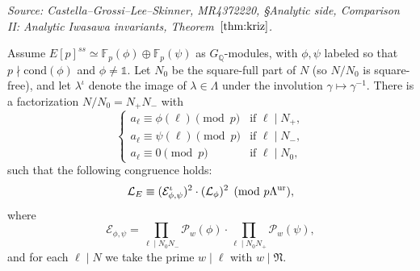 \begin{theorem}
  \label{thm:kriz}
  \textit{Source: Castella--Grossi--Lee--Skinner, MR4372220, §Analytic side, Comparison II: Analytic Iwasawa invariants, Theorem~\(\ref{thm:kriz}\).}

  Assume \(E[p]^{ss}\simeq\mathbb{F}_p(\phi)\oplus\mathbb{F}_p(\psi)\) as \(G_{\mathbb{Q}}\)-modules, with \(\phi,\psi\) labeled so that \(p\nmid\mathrm{cond}(\phi)\) and \(\phi\neq\mathds{1}\). Let \(N_0\) be the square-full part of \(N\) (so \(N/N_0\) is square-free), and let \(\lambda^\iota\) denote the image of \(\lambda\in\Lambda\) under the involution \(\gamma\mapsto\gamma^{-1}\). There is a factorization \(N/N_0 = N_+ N_-\) with
  \[
    \begin{cases}
      a_\ell \equiv \phi(\ell)\pmod{p} & \text{if } \ell\mid N_+,\\
      a_\ell \equiv \psi(\ell)\pmod{p} & \text{if } \ell\mid N_-,\\
      a_\ell \equiv 0\pmod{p}          & \text{if } \ell\mid N_0,
    \end{cases}
  \]
  such that the following congruence holds:
  \[
    \mathcal{L}_E \equiv (\mathcal{E}_{\phi,\psi}^\iota)^2 \cdot (\mathcal{L}_\phi)^2 \pmod{p\Lambda^{\mathrm{ur}}},
  \]
  where
  \[
    \mathcal{E}_{\phi,\psi}
    = \prod_{\ell\mid N_0 N_-}\mathcal{P}_w(\phi)
      \cdot\prod_{\ell\mid N_0 N_+}\mathcal{P}_w(\psi),
  \]
  and for each \(\ell\mid N\) we take the prime \(w\mid\ell\) with \(w\mid\mathfrak{N}\).
\end{theorem}

